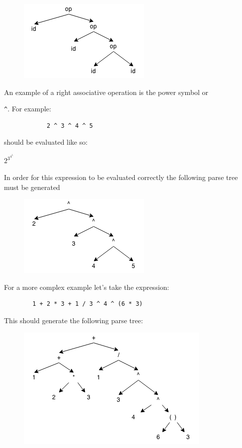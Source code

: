 \documentclass{article}
\newcommand{\code}[1]{\texttt{\textmd{#1}}}
\begin{document}
		\begin{figure}[H]
			\centering
			\includegraphics{static/right-assoc-gen.png}
		\end{figure}
		
		An example of a right associative operation is the power symbol or
		
		\code{\textasciicircum}. For example:
		
		\begin{lstlisting}
			2 ^ 3 ^ 4 ^ 5
		\end{lstlisting}
		
		should be evaluated like so:
		
		\begin{math}
			2 ^ {\displaystyle 3 ^ {\displaystyle 4 ^ {\displaystyle 5 }}}
		\end{math}
		
		In order for this expression to be evaluated correctly the following parse tree must be generated
		
		\begin{figure}[H]
			\centering
			\includegraphics{static/right-assoc-pow.png}
		\end{figure}
		
		For a more complex example let's take the expression:
		
		\begin{lstlisting}
		1 + 2 * 3 + 1 / 3 ^ 4 ^ (6 * 3)
		\end{lstlisting}
		
		This should generate the following parse tree:
		
		\begin{figure}[H]
			\centering
			\includegraphics{static/assoc-example.png}
		\end{figure}
\end{document}
